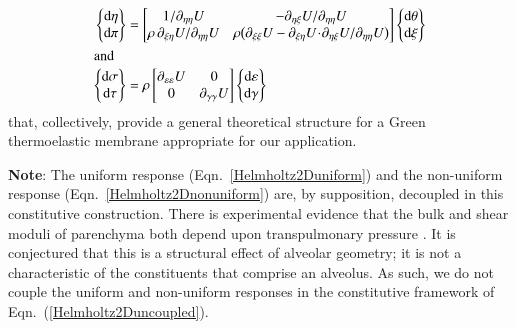 \begin{subequations}
\label{Helmholtz2Duncoupled}
\begin{align}
\left\{ \begin{matrix}
\mathrm{d} \eta \\ \mathrm{d} \pi 
\end{matrix} \right\} & = \begin{bmatrix}
1 / \partial_{\eta\eta} U & 
-\partial_{\eta\xi} U / \partial_{\eta\eta} U \\ 
\rho \, \partial_{\xi\eta} U / \partial_{\eta\eta} U & 
\rho \bigl( \partial_{\xi\xi} U - \partial_{\xi\eta} U \!\cdot\! \partial_{\eta\xi} U / \partial_{\eta\eta} U \bigr)  
\end{bmatrix} 
\left\{ \begin{matrix}
\mathrm{d}\theta \\ \mathrm{d} \xi 
\end{matrix} \right\}
\label{Helmholtz2Duniform} \\
\intertext{and}
\left\{ \begin{matrix}
    \mathrm{d} \sigma \\ \mathrm{d} \tau
\end{matrix} \right\} & = \rho \begin{bmatrix}
    \partial_{\varepsilon\varepsilon} U & 0 \\
    0 & \partial_{\gamma\gamma} U 
\end{bmatrix} 
\left\{ \begin{matrix}
    \mathrm{d} \varepsilon \\ \mathrm{d} \gamma
\end{matrix} \right\}
\label{Helmholtz2Dnonuniform}
\end{align} 
\end{subequations}
that, collectively, provide a general theoretical structure for a Green thermo\-elastic membrane appropriate for our application.

\medskip\noindent
\textbf{Note}:  The uniform response (Eqn.~\ref{Helmholtz2Duniform}) and the non-uniform response (Eqn.~\ref{Helmholtz2Dnonuniform}) are, by supposition, decoupled in this constitutive construction.  There is experimental evidence that the bulk and shear moduli of parenchyma both depend upon transpulmonary pressure \cite{LaiFook79,Jahedetal90}.  It is conjectured that this is a structural effect of alveolar geometry; it is not a characteristic of the constituents that comprise an alveolus.  As such, we do not couple the uniform and non-uniform responses in the constitutive framework of Eqn.~(\ref{Helmholtz2Duncoupled}).

